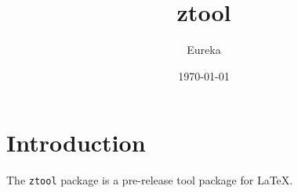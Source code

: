 \documentclass{zlatex}
\title{ztool}
\author{Eureka}
\date{\today}
\begin{document}
\maketitle

\section{Introduction}
The \texttt{ztool} package is a pre-release tool package for LaTeX.
\end{document}
